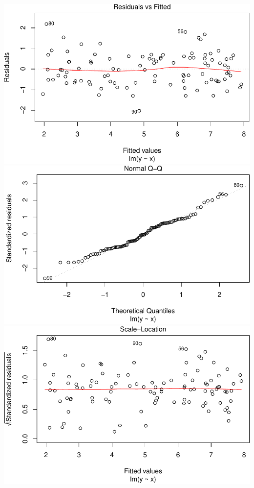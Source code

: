 \documentclass[]{article}
\theoremstyle{definition}
\theoremstyle{definition}
\theoremstyle{definition}
\theoremstyle{remark}
\begin{document}
\includegraphics{./unnamed-chunk-26-1.pdf}
\includegraphics{./unnamed-chunk-26-2.pdf}
\includegraphics{./unnamed-chunk-26-3.pdf}
\end{document}
